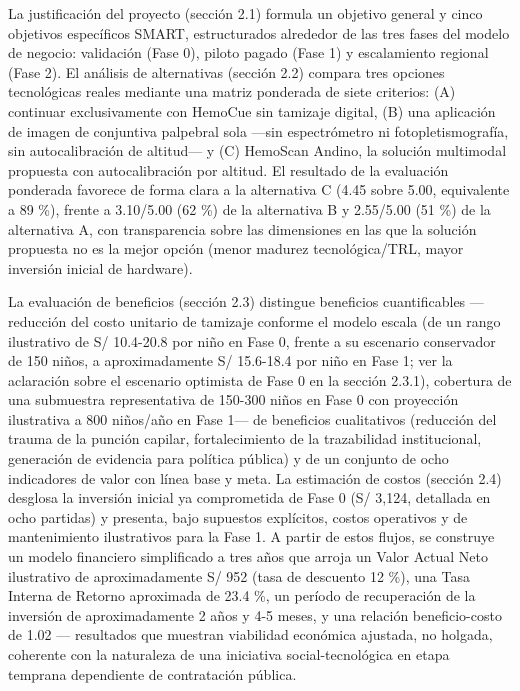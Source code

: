 \documentclass[11pt,a4paper]{article}
\begin{document}
La justificación del proyecto (sección 2.1) formula un objetivo general y cinco objetivos específicos SMART, estructurados alrededor de las tres fases del modelo de negocio: validación (Fase 0), piloto pagado (Fase 1) y escalamiento regional (Fase 2). El análisis de alternativas (sección 2.2) compara tres opciones tecnológicas reales mediante una matriz ponderada de siete criterios: (A) continuar exclusivamente con HemoCue sin tamizaje digital, (B) una aplicación de imagen de conjuntiva palpebral sola ---sin espectrómetro ni fotopletismografía, sin autocalibración de altitud--- y (C) HemoScan Andino, la solución multimodal propuesta con autocalibración por altitud. El resultado de la evaluación ponderada favorece de forma clara a la alternativa C (4.45 sobre 5.00, equivalente a 89 \%), frente a 3.10/5.00 (62 \%) de la alternativa B y 2.55/5.00 (51 \%) de la alternativa A, con transparencia sobre las dimensiones en las que la solución propuesta no es la mejor opción (menor madurez tecnológica/TRL, mayor inversión inicial de hardware).

La evaluación de beneficios (sección 2.3) distingue beneficios cuantificables ---reducción del costo unitario de tamizaje conforme el modelo escala (de un rango ilustrativo de S/ 10.4-20.8 por niño en Fase 0, frente a su escenario conservador de 150 niños, a aproximadamente S/ 15.6-18.4 por niño en Fase 1; ver la aclaración sobre el escenario optimista de Fase 0 en la sección 2.3.1), cobertura de una submuestra representativa de 150-300 niños en Fase 0 con proyección ilustrativa a 800 niños/año en Fase 1--- de beneficios cualitativos (reducción del trauma de la punción capilar, fortalecimiento de la trazabilidad institucional, generación de evidencia para política pública) y de un conjunto de ocho indicadores de valor con línea base y meta. La estimación de costos (sección 2.4) desglosa la inversión inicial ya comprometida de Fase 0 (S/ 3,124, detallada en ocho partidas) y presenta, bajo supuestos explícitos, costos operativos y de mantenimiento ilustrativos para la Fase 1. A partir de estos flujos, se construye un modelo financiero simplificado a tres años que arroja un Valor Actual Neto ilustrativo de aproximadamente S/ 952 (tasa de descuento 12 \%), una Tasa Interna de Retorno aproximada de 23.4 \%, un período de recuperación de la inversión de aproximadamente 2 años y 4-5 meses, y una relación beneficio-costo de 1.02 --- resultados que muestran viabilidad económica ajustada, no holgada, coherente con la naturaleza de una iniciativa social-tecnológica en etapa temprana dependiente de contratación pública.
\end{document}

